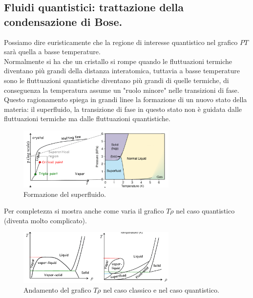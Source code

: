 \subsection{Fluidi quantistici: trattazione della condensazione di Bose.}
\label{subsec:Fluidi quantistici: trattazione della condensazione di Bose.}
Possiamo dire euristicamente che la regione di interesse quantistico nel grafico $PT$ sarà quella a basse temperature. \\
Normalmente si ha che un cristallo si rompe quando le fluttuazioni termiche diventano più grandi della distanza interatomica, tuttavia a basse temperature sono le fluttuazioni quantistiche diventano più grandi di quelle termiche, di conseguenza la temperatura assume un "ruolo minore" nelle transizioni di fase.\\
Questo ragionamento spiega in grandi linee la formazione di un nuovo stato della materia: il superfluido, la transizione di fase in questo stato non è guidata dalle fluttuazioni termiche ma dalle fluttuazioni quantistiche.
\begin{figure}[ht]
	\centering
	\includegraphics[width=0.7\textwidth]{figures/superfluido.png}
	\caption{Formazione del superfluido.}
	\label{fig:ffigures-superfluido-png}
\end{figure}
Per completezza si mostra anche come varia il grafico $T\rho $ nel caso quantistico (diventa molto complicato).
\begin{figure}[ht]
	\centering
	\includegraphics[width=0.7\textwidth]{figures/Tr-quantistico.png}
	\caption{Andamento del grafico $T\rho $ nel caso classico e nel caso quantistico.}
	\label{fig:figures-Tr-quantistico-png}
\end{figure}
